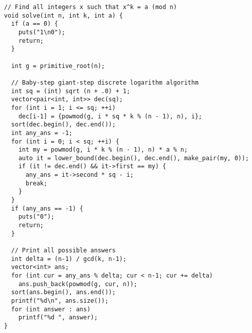 \begin{center}
\begin{minipage}[t]{0.45\linewidth}
\begin{lstlisting}
// Find all integers x such that x^k = a (mod n)
void solve(int n, int k, int a) {
  if (a == 0) {
    puts("1\n0");
    return;
  }

  int g = primitive_root(n);

  // Baby-step giant-step discrete logarithm algorithm
  int sq = (int) sqrt (n + .0) + 1;
  vector<pair<int, int>> dec(sq);
  for (int i = 1; i <= sq; ++i)
    dec[i-1] = {powmod(g, i * sq * k % (n - 1), n), i};
  sort(dec.begin(), dec.end());
  int any_ans = -1;
  for (int i = 0; i < sq; ++i) {
    int my = powmod(g, i * k % (n - 1), n) * a % n;
    auto it = lower_bound(dec.begin(), dec.end(), make_pair(my, 0));
    if (it != dec.end() && it->first == my) {
      any_ans = it->second * sq - i;
      break;
    }
  }
  if (any_ans == -1) {
    puts("0");
    return;
  }

  // Print all possible answers
  int delta = (n-1) / gcd(k, n-1);
  vector<int> ans;
  for (int cur = any_ans % delta; cur < n-1; cur += delta)
    ans.push_back(powmod(g, cur, n));
  sort(ans.begin(), ans.end());
  printf("%d\n", ans.size());
  for (int answer : ans)
    printf("%d ", answer);
}

\end{lstlisting}
\end{minipage}
\end{center}

\newpage

